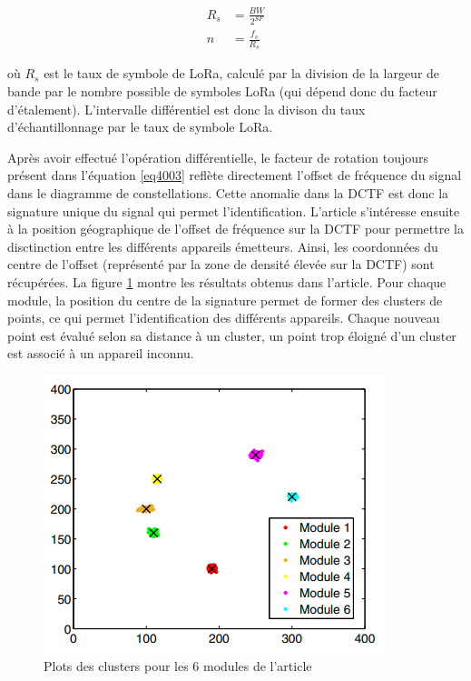 \begin{align}\label{eq4006}
	R_s &= \frac{BW}{2^{SF}} \\
	n	&= \frac{f_s}{R_s}
\end{align}

où $R_s$ est le taux de symbole de \ac{LoRa}, calculé par la division de la largeur de bande par le nombre possible de symboles \ac{LoRa} (qui dépend donc du facteur d'étalement). L'intervalle différentiel est donc la divison du taux d'échantillonnage par le taux de symbole \ac{LoRa}.

\vspace{0.1cm}

Après avoir effectué l'opération différentielle, le facteur de rotation toujours présent dans l'équation \ref{eq4003} reflète directement l'offset de fréquence du signal dans le diagramme de constellations. Cette anomalie dans la \ac{DCTF} est donc la signature unique du signal qui permet l'identification. L'article s'intéresse ensuite à la position géographique de l'offset de fréquence sur la \ac{DCTF} pour permettre la disctinction entre les différents appareils émetteurs. Ainsi, les coordonnées du centre de l'offset (représenté par la zone de densité élevée sur la \ac{DCTF}) sont récupérées. La figure \ref{term4000} montre les résultats obtenus dans l'article. Pour chaque module, la position du centre de la signature permet de former des clusters de points, ce qui permet l'identification des différents appareils. Chaque nouveau point est évalué selon sa distance à un cluster, un point trop éloigné d'un cluster est associé à un appareil inconnu.


\begin{figure}[h]
\centering

\includegraphics[scale=0.8]{images/impossible.png}
\caption{Plots des clusters pour les 6 modules de l'article\cite{loraDCTF}}\label{term4000}
\end{figure}

